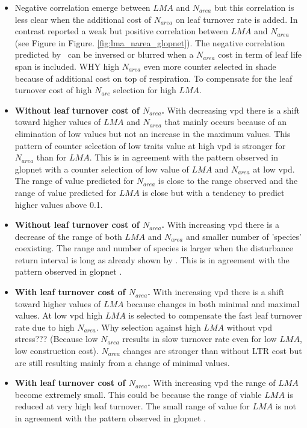 \documentclass[a4paper,11pt]{article}
\begin{document}
\begin{itemize}

\item Negative correlation emerge between $LMA$ and $N_{area}$ but
  this correlation is less clear when the additional cost of $N_{area}$
  on leaf turnover rate is added. In contrast \citet{Wright-2004}
  reported a weak but positive correlation between $LMA$ and
  $N_{area}$ (see Figure in Figure. \ref{fig:lma_narea_glopnet}). The
  negative correlation predicted by \plant\ can be inversed or
 blurred when a $N_{area}$ cost in term of leaf life span is
 included. WHY high $N_{area}$ even more counter selected in shade
 because of additional cost on top of respiration. To compensate for
 the leaf turnover cost of high $N_{are}$ selection for high $LMA$.
  
\item \textbf{Without leaf turnover cost of $N_{area}$.} With
  decreasing vpd there is a shift toward higher values of $LMA$ and
  $N_{area}$ that mainly occurs because of an elimination of low
  values but not an increase in the maximum values. This pattern of
  counter selection of low traits value at high vpd is stronger for
  $N_{area}$ than for $LMA$. This is in agreement with the pattern
  observed in glopnet \citep{Wright-2004} with a counter selection of
  low value of $LMA$ and $N_{area}$ at low vpd. The range of value
  predicted for $N_{area}$ is close to the range observed and the
  range of value predicted for $LMA$ is close but with a tendency to
  predict higher values above 0.1.  

\item \textbf{Without leaf turnover cost of $N_{area}$.} With
  increasing vpd there is a decrease of the range of both $LMA$ and
  $N_{area}$ and smaller number of 'species' coexisting. The range and
  number of species is larger when the disturbance return interval is
  long as already shown by \citet{Falster-2017}. This is in agreement with the pattern observed in glopnet \citep{Wright-2004}.

\item \textbf{With leaf turnover cost of $N_{area}$.} With increasing
  vpd there is a shift toward higher values of $LMA$ because changes
  in both minimal and maximal values. At low vpd high $LMA$ is
  selected to compensate the fast leaf turnover rate due to high
  $N_{area}$. Why selection against high $LMA$ without vpd stress???
  (Because low $N_{area}$ rresults in slow turnover rate even for low
  $LMA$, low construction cost). $N_{area}$ changes are stronger
  than without LTR cost but are still resulting mainly from a change
  of minimal values. 

\item \textbf{With leaf turnover cost of $N_{area}$.} With increasing
  vpd the range of $LMA$ become extremely small. This could be because
  the range of viable $LMA$ is reduced at very high leaf turnover. The small range of
  value for $LMA$ is not in agreement with the pattern observed in
  glopnet \citep{Wright-2004}. 

\end{itemize}


\clearpage



\end{document}
